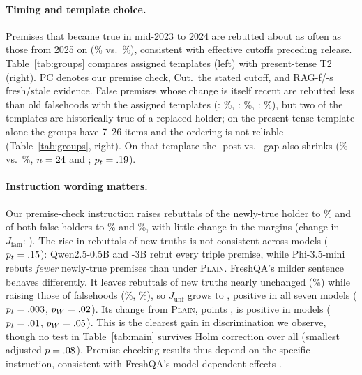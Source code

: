 \paragraph{Timing and template choice.}
Premises that became true in mid-2023 to 2024 are rebutted about as often as those from 2025 on (\WGNearPlain\% vs.\ \WGNewPlain\%), consistent with effective cutoffs preceding release. Table~\ref{tab:groups} compares assigned templates (left) with present-tense T2 (right). PC denotes our premise check, Cut.\ the stated cutoff, and RAG-f/-s fresh/stale evidence. False premises whose change is itself recent are rebutted less than old falsehoods with the assigned templates (\STRL{}: \WGStrlPlain\%, \STP{}: \WGStpPlain\%, \STRE{}: \WGStrePlain\%), but two of the templates are historically true of a replaced holder; on the present-tense template alone the groups have 7--26 items and the ordering is not reliable (Table~\ref{tab:groups}, right). On that template the \NEW{}-post vs.\ \OLD{} gap also shrinks (\WTtNew\% vs.\ \WTtOld\%, $n=24$ and \WTtOldN; $p_t=.19$).

\paragraph{Instruction wording matters.}
Our premise-check instruction raises rebuttals of the newly-true holder to \WNPrem\% and of both false holders to \WAPrem\% and \WSPrem\%, with little change in the margins (change in $J_{\text{fam}}$: \WDJfamPrem{} \WDJfamPremCI). The rise in rebuttals of new truths is not consistent across models ($p_t=.15$): Qwen2.5-0.5B and -3B rebut every triple premise, while Phi-3.5-mini rebuts \emph{fewer} newly-true premises than under \textsc{Plain}. FreshQA's milder sentence behaves differently. It leaves rebuttals of new truths nearly unchanged (\WNPremFq\%) while raising those of falsehoods (\WAPremFq\%, \WSPremFq\%), so $J_{\text{unf}}$ grows to \WJunfPremFq{} \WJunfPremFqCI{}, positive in all seven models ($p_t=.003$, $p_W=.02$). Its change from \textsc{Plain}, \WDJunfPremFq{} points \WDJunfPremFqCI, is positive in \WDJunfPremFqPos{} models ($p_t=.01$, $p_W=.05$). This is the clearest gain in discrimination we observe, though no test in Table~\ref{tab:main} survives Holm correction over all \WTabOneN{} (smallest adjusted $p=.08$). Premise-checking results thus depend on the specific instruction, consistent with FreshQA's model-dependent effects \citep{vu2024freshllms}.


